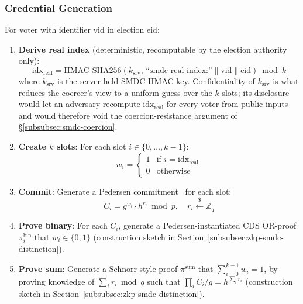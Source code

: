 \subsubsection{Credential Generation}
\label{subsubsec:smdc-gen}

For voter with identifier $\text{vid}$ in election $\text{eid}$:

\begin{enumerate}
    \item \textbf{Derive real index} (deterministic, recomputable by the election authority only):
    \begin{equation}
        \text{idx}_{\text{real}} = \text{HMAC-SHA256}(k_{\text{srv}},\, \text{``smdc-real-index:''} \| \text{vid} \| \text{eid}) \bmod k
        \label{eq:smdc-index}
    \end{equation}
    where $k_{\text{srv}}$ is the server-held SMDC HMAC key. Confidentiality of $k_{\text{srv}}$ is what reduces the coercer's view to a uniform guess over the $k$ slots; its disclosure would let an adversary recompute $\text{idx}_{\text{real}}$ for every voter from public inputs and would therefore void the coercion-resistance argument of \S\ref{subsubsec:smdc-coercion}.
    
    \item \textbf{Create $k$ slots}: For each slot $i \in \{0, \ldots, k-1\}$:
    \begin{equation}
        w_i = \begin{cases} 1 & \text{if } i = \text{idx}_{\text{real}} \\ 0 & \text{otherwise} \end{cases}
    \end{equation}
    
    \item \textbf{Commit}: Generate a Pedersen commitment~\cite{pedersen1991} for each slot:
    \begin{equation}
        C_i = g^{w_i} \cdot h^{r_i} \bmod p, \quad r_i \xleftarrow{\$} \mathbb{Z}_q
        \label{eq:smdc-commit}
    \end{equation}
    
    \item \textbf{Prove binary}: For each $C_i$, generate a Pedersen-instantiated CDS OR-proof $\pi_i^{\text{bin}}$ that $w_i \in \{0, 1\}$ (construction sketch in Section~\ref{subsubsec:zkp-smdc-distinction}).

    \item \textbf{Prove sum}: Generate a Schnorr-style proof $\pi^{\text{sum}}$ that $\sum_{i=0}^{k-1} w_i = 1$, by proving knowledge of $\sum_i r_i \bmod q$ such that $\prod_i C_i / g = h^{\sum_i r_i}$ (construction sketch in Section~\ref{subsubsec:zkp-smdc-distinction}).
\end{enumerate}

